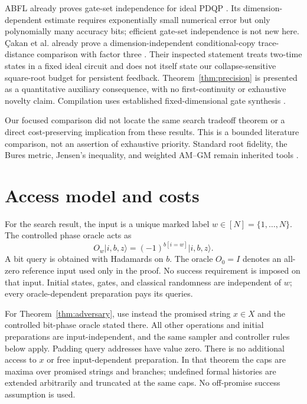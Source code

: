 \documentclass[11pt]{article}
\theoremstyle{remark}
\newcommand{\ket}[1]{\lvert #1\rangle}
\begin{document}
ABFL already proves gate-set independence for ideal PDQP
\cite[Appendix D]{abfl}. Its dimension-dependent estimate requires
exponentially small numerical error but only polynomially many accuracy
bits; efficient gate-set independence is not new here.
\c{C}akan et al. already prove a dimension-independent conditional-copy
trace-distance comparison with factor three
\cite[Section 8.2, Claim 8.3]{cakan}. Their inspected statement treats
two-time states in a fixed ideal circuit and does not itself state our
collapse-sensitive square-root budget for persistent feedback.
Theorem~\ref{thm:precision} is presented as a quantitative auxiliary
consequence, with no first-continuity or exhaustive novelty claim.
Compilation uses established fixed-dimensional gate synthesis \cite{dn}.

Our focused comparison did not locate the same search tradeoff theorem or a direct
cost-preserving implication from these results. This is a bounded literature
comparison, not an assertion of exhaustive priority. Standard root fidelity,
the Bures metric, Jensen's inequality, and weighted AM--GM remain inherited
tools \cite{gln}.

\section{Access model and costs}\label{sec:model}
For the search result, the input is a unique marked label $w\in[N]=\{1,\ldots,N\}$. The controlled
phase oracle acts as
\begin{equation}
 O_w\ket{i,b,z}=(-1)^{b[i=w]}\ket{i,b,z}.
\end{equation}
A bit query is obtained with Hadamards on $b$. The oracle $O_0=I$ denotes an
all-zero reference input used only in the proof. No success requirement is
imposed on that input. Initial states, gates, and classical randomness are
independent of $w$; every oracle-dependent preparation pays its queries.

For Theorem~\ref{thm:adversary}, use instead the promised string $x\in X$
and the controlled bit-phase oracle stated there. All other operations and
initial preparations are input-independent, and the same sampler and
controller rules below apply. Padding query addresses have value zero.
There is no additional access to $x$ or free input-dependent preparation.
In that theorem the caps are maxima over promised strings and branches;
undefined formal histories are extended arbitrarily and truncated at the
same caps. No off-promise success assumption is used.
\end{document}
